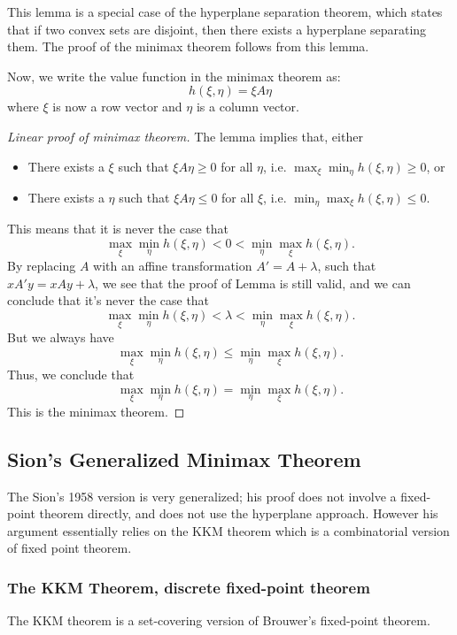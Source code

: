 This lemma is a special case of the hyperplane separation theorem, which states that if two convex sets are disjoint, then there exists a hyperplane separating them. The proof of the minimax theorem follows from this lemma. 

Now, we write the value function in the minimax theorem as:
\[
h(\xi, \eta)  = \xi A \eta
\]
where $\xi$ is now a row vector and $\eta$ is a column vector. 

\begin{proof}[Linear proof of minimax theorem]
The lemma implies that, either
\begin{itemize}
    \item There exists a $\xi$ such that $\xi A \eta \geq 0$ for all $\eta$, i.e. $\max_{\xi} \min_{\eta} h(\xi, \eta) \geq 0$, or
    \item There exists a $\eta$ such that $\xi A \eta \leq  0$ for all $\xi$, i.e. $\min_{\eta} \max_{\xi} h(\xi, \eta) \leq 0$.
\end{itemize}
This means that it is never the case that
\[
\max_{\xi} \min_{\eta} h(\xi, \eta) < 0 < \min_{\eta} \max_{\xi} h(\xi, \eta).
\]
By replacing $A$ with an affine transformation $A' = A + \lambda$, such that $xA'y = xAy + \lambda$, we see that the proof of Lemma is still valid, and we can conclude that it's never the case that
\[
\max_{\xi} \min_{\eta} h(\xi, \eta) < \lambda < \min_{\eta} \max_{\xi} h(\xi, \eta).
\]
But we always have
\[
\max_{\xi} \min_{\eta} h(\xi, \eta) \leq \min_{\eta} \max_{\xi} h(\xi, \eta).
\]
Thus, we conclude that
\[
\max_{\xi} \min_{\eta} h(\xi, \eta) = \min_{\eta} \max_{\xi} h(\xi, \eta).
\]
This is the minimax theorem.
\end{proof}

\subsection{Sion's Generalized Minimax Theorem}

The Sion’s 1958 version is very generalized; his proof does not involve a fixed-point theorem directly, and does not use the hyperplane approach. However his argument essentially relies on the KKM theorem which is a combinatorial version of fixed point theorem. 

\subsubsection{The KKM Theorem, discrete fixed-point theorem}

The KKM theorem is a set-covering version of Brouwer's fixed-point theorem.

